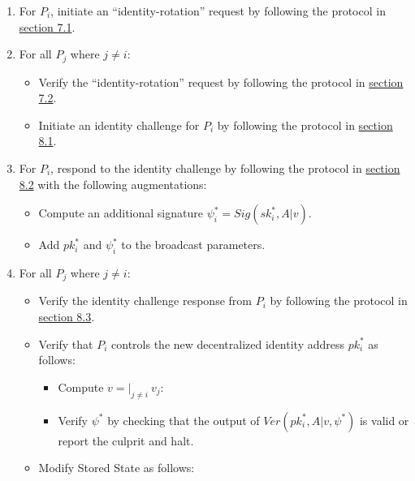 \documentclass[
]{article}
\providecommand{\tightlist}{%
  \setlength{\itemsep}{0pt}\setlength{\parskip}{0pt}}
\begin{document}
\begin{enumerate}
\def\labelenumi{\arabic{enumi}.}
\tightlist
\item
  For \(P_i\), initiate an ``identity-rotation'' request by following
  the protocol in
  \protect\hyperlink{identity-authed-request-initiation}{section 7.1}.
\item
  For all \(P_j\) where \(j \neq i\):

  \begin{itemize}
  \tightlist
  \item
    Verify the ``identity-rotation'' request by following the protocol
    in \protect\hyperlink{identity-authed-request-verification}{section
    7.2}.
  \item
    Initiate an identity challenge for \(P_i\) by following the protocol
    in \protect\hyperlink{identity-challenge-initiation}{section 8.1}.
  \end{itemize}
\item
  For \(P_i\), respond to the identity challenge by following the
  protocol in \protect\hyperlink{identity-challenge-response}{section
  8.2} with the following augmentations:

  \begin{itemize}
  \tightlist
  \item
    Compute an additional signature
    \(\psi _i^ \ast = Sig(sk_i^ \ast, A | v)\).
  \item
    Add \(pk_i^ \ast\) and \(\psi _i^ \ast\) to the broadcast
    parameters.
  \end{itemize}
\item
  For all \(P_j\) where \(j \neq i\):

  \begin{itemize}
  \tightlist
  \item
    Verify the identity challenge response from \(P_i\) by following the
    protocol in
    \protect\hyperlink{identity-challenge-verification}{section 8.3}.
  \item
    Verify that \(P_i\) controls the new decentralized identity address
    \(pk_i^ \ast\) as follows:

    \begin{itemize}
    \tightlist
    \item
      Compute \(v = | _{j \neq i} \: v_j\):
    \item
      Verify \(\psi ^ \ast\) by checking that the output of
      \(Ver(pk_i^ \ast, A | v, \psi ^ \ast)\) is valid or report the
      culprit and halt.
    \end{itemize}
  \item
    Modify Stored State as follows:


\end{itemize}
\end{enumerate}
\end{document}
